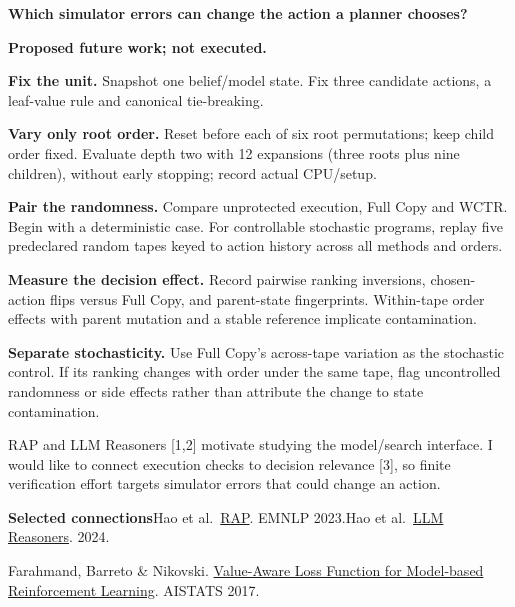 \documentclass[10pt]{article}
\newcommand{\protocolitem}[2]{\noindent
  \makebox[6mm][l]{\color{Teal}\bfseries #1}%
  \begin{minipage}[t]{\dimexpr\linewidth-6mm\relax}#2\end{minipage}\par\vspace{4pt}}
\begin{document}
{\fontsize{16.1}{20}\selectfont\bfseries\color{Navy}
Which simulator errors can change the action a planner chooses?\par}
\vspace{3pt}
{\fontsize{10.2}{13}\selectfont\color{Teal}\textbf{Proposed future work; not executed.}\par}
\vspace{4pt}
\protocolitem{1}{\textbf{Fix the unit.} Snapshot one belief/model state.
Fix three candidate actions, a leaf-value rule and canonical tie-breaking.}
\protocolitem{2}{\textbf{Vary only root order.} Reset before each of six root
permutations; keep child order fixed. Evaluate depth two with 12 expansions
(three roots plus nine children), without early stopping; record actual CPU/setup.}
\protocolitem{3}{\textbf{Pair the randomness.} Compare unprotected execution,
Full Copy and WCTR. Begin with a deterministic case. For controllable stochastic
programs, replay five predeclared random tapes keyed to action history across
all methods and orders.}
\protocolitem{4}{\textbf{Measure the decision effect.} Record pairwise ranking
inversions, chosen-action flips versus Full Copy, and parent-state fingerprints.
Within-tape order effects with parent mutation and a stable reference implicate contamination.}
\protocolitem{5}{\textbf{Separate stochasticity.} Use Full Copy's across-tape
variation as the stochastic control. If its ranking changes with order under
the same tape, flag uncontrolled randomness or side effects rather than attribute
the change to state contamination.}

\vspace{3pt}
RAP and LLM Reasoners [1,2] motivate studying the model/search interface.
I would like to connect execution checks to decision relevance [3], so finite
verification effort targets simulator errors that could change an action.

\vspace{4pt}
{\smallnote
\textbf{\color{Navy}Selected connections}\quad
[1] Hao et al.\ \href{https://arxiv.org/abs/2305.14992v2}{RAP}. EMNLP 2023.\quad
[2] Hao et al.\ \href{https://arxiv.org/abs/2404.05221v2}{LLM Reasoners}. 2024.\par
[3] Farahmand, Barreto \& Nikovski.
\href{https://proceedings.mlr.press/v54/farahmand17a.html}{Value-Aware Loss Function for Model-based Reinforcement Learning}. AISTATS 2017.\par}
\end{document}
